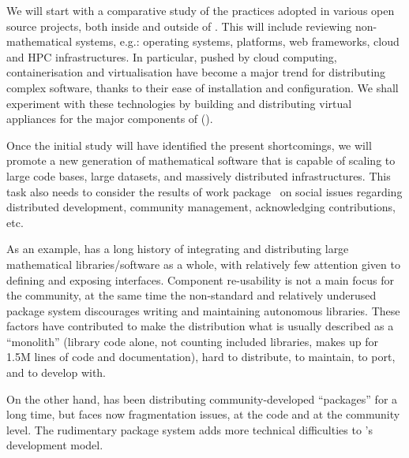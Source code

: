 \begin{workpackage}[id=component-architecture,wphases=0-48!.5,
  title=Component Architecture,lead=UV,
  PSRM=50,UVRM=8,SARM=16, USORM=6, UORM=4, LLRM=14, UJFRM=6, UGRM=14]
\begin{tasklist}
\begin{task}[title=Modularisation and packaging,id=mod-packaging,lead=UV,PM=20,partners={PS,LL,UG},wphases=0-48]
    We will start with a comparative study of the practices adopted in
    various open source projects, both inside and outside of
    \TheProject. This will include reviewing non-mathematical systems,
    e.g.: operating systems, platforms, web frameworks, cloud and HPC
    infrastructures.  In particular, pushed by cloud computing,
    containerisation \cite{Docker} and virtualisation
    \cite{Virtualbox} have become a major trend for distributing
    complex software, thanks to their ease of installation and
    configuration. We shall experiment with these technologies by
    building and distributing virtual appliances for the major
    components of \TheProject
    ().

    Once the initial study will have identified the present
    shortcomings, we will promote a new generation of mathematical
    software that is capable of scaling to large code bases, large
    datasets, and massively distributed infrastructures. This task
    also needs to consider the results of work
    package~ on social issues regarding
    distributed development, community management, acknowledging
    contributions, etc.

    As an example, \Sage has a long history of integrating and
    distributing large mathematical libraries/software as a whole,
    with relatively few attention given to defining and exposing
    interfaces. Component re-usability is not a main focus for the
    \Sage community, at the same time the non-standard and relatively
    underused package system discourages writing and maintaining
    autonomous libraries. These factors have contributed to make the
    \Sage distribution what is usually described as a ``monolith''
    (\Sage library code alone, not counting included libraries, makes
    up for 1.5M lines of code and documentation), hard to distribute,
    to maintain, to port, and to develop with.

    On the other hand, \GAP has been distributing
    community-developed ``\GAP packages'' for a long time, but faces
    now fragmentation issues, at the code and at the community
    level. The rudimentary package system adds more technical
    difficulties to \GAP's development model.


\end{task}
\end{tasklist}
\end{workpackage}
